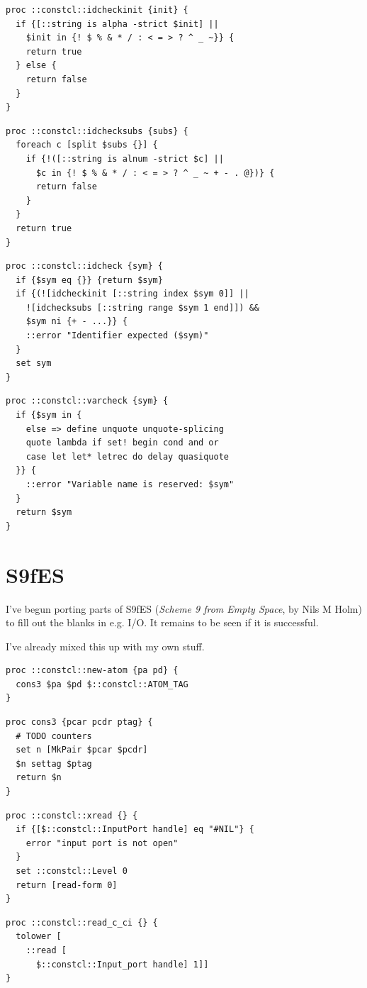 \documentclass[twoside,9pt]{report}
\begin{document}
\begin{lstlisting}
proc ::constcl::idcheckinit {init} {
  if {[::string is alpha -strict $init] ||
    $init in {! $ % & * / : < = > ? ^ _ ~}} {
    return true
  } else {
    return false
  }
}
\end{lstlisting}
\begin{lstlisting}
proc ::constcl::idchecksubs {subs} {
  foreach c [split $subs {}] {
    if {!([::string is alnum -strict $c] ||
      $c in {! $ % & * / : < = > ? ^ _ ~ + - . @})} {
      return false
    }
  }
  return true
}
\end{lstlisting}
\begin{lstlisting}
proc ::constcl::idcheck {sym} {
  if {$sym eq {}} {return $sym}
  if {(![idcheckinit [::string index $sym 0]] ||
    ![idchecksubs [::string range $sym 1 end]]) &&
    $sym ni {+ - ...}} {
    ::error "Identifier expected ($sym)"
  }
  set sym
}
\end{lstlisting}
\begin{lstlisting}
proc ::constcl::varcheck {sym} {
  if {$sym in {
    else => define unquote unquote-splicing
    quote lambda if set! begin cond and or
    case let let* letrec do delay quasiquote
  }} {
    ::error "Variable name is reserved: $sym"
  }
  return $sym
}
\end{lstlisting}
\chapter{S9fES}
\label{s9fes}


I've begun porting parts of S9fES (\emph{Scheme 9 from Empty Space}, by Nils M Holm) to fill out the blanks in e.g. I/O. It remains to be seen if it is successful.


I've already mixed this up with my own stuff.

\begin{lstlisting}
proc ::constcl::new-atom {pa pd} {
  cons3 $pa $pd $::constcl::ATOM_TAG
}
\end{lstlisting}
\begin{lstlisting}
proc cons3 {pcar pcdr ptag} {
  # TODO counters
  set n [MkPair $pcar $pcdr]
  $n settag $ptag
  return $n
}
\end{lstlisting}
\begin{lstlisting}
proc ::constcl::xread {} {
  if {[$::constcl::InputPort handle] eq "#NIL"} {
    error "input port is not open"
  }
  set ::constcl::Level 0
  return [read-form 0]
}
\end{lstlisting}
\begin{lstlisting}
proc ::constcl::read_c_ci {} {
  tolower [
    ::read [
      $::constcl::Input_port handle] 1]]
}
\end{lstlisting}
\end{document}
